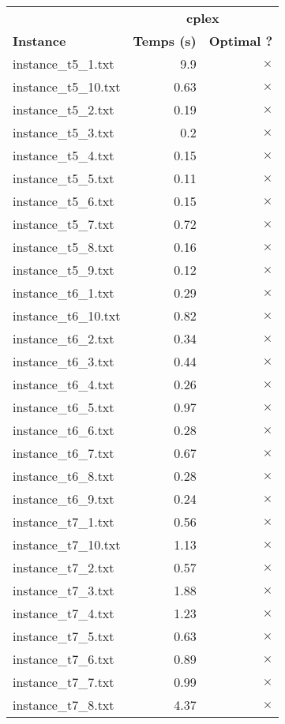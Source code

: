 \documentclass{article}
\begin{document}
\begin{center}
\renewcommand{\arraystretch}{1.4} 
 \begin{tabular}{lrr}
	\hline
 & \multicolumn{2}{c}{\textbf{cplex}}\\
\textbf{Instance}  & \textbf{Temps (s)} & \textbf{Optimal ?} \\\hline

instance\_t5\_1.txt & 9.9 & 
$\times$
\\
instance\_t5\_10.txt & 0.63 & 
$\times$
\\
instance\_t5\_2.txt & 0.19 & 
$\times$
\\
instance\_t5\_3.txt & 0.2 & 
$\times$
\\
instance\_t5\_4.txt & 0.15 & 
$\times$
\\
instance\_t5\_5.txt & 0.11 & 
$\times$
\\
instance\_t5\_6.txt & 0.15 & 
$\times$
\\
instance\_t5\_7.txt & 0.72 & 
$\times$
\\
instance\_t5\_8.txt & 0.16 & 
$\times$
\\
instance\_t5\_9.txt & 0.12 & 
$\times$
\\
instance\_t6\_1.txt & 0.29 & 
$\times$
\\
instance\_t6\_10.txt & 0.82 & 
$\times$
\\
instance\_t6\_2.txt & 0.34 & 
$\times$
\\
instance\_t6\_3.txt & 0.44 & 
$\times$
\\
instance\_t6\_4.txt & 0.26 & 
$\times$
\\
instance\_t6\_5.txt & 0.97 & 
$\times$
\\
instance\_t6\_6.txt & 0.28 & 
$\times$
\\
instance\_t6\_7.txt & 0.67 & 
$\times$
\\
instance\_t6\_8.txt & 0.28 & 
$\times$
\\
instance\_t6\_9.txt & 0.24 & 
$\times$
\\
instance\_t7\_1.txt & 0.56 & 
$\times$
\\
instance\_t7\_10.txt & 1.13 & 
$\times$
\\
instance\_t7\_2.txt & 0.57 & 
$\times$
\\
instance\_t7\_3.txt & 1.88 & 
$\times$
\\
instance\_t7\_4.txt & 1.23 & 
$\times$
\\
instance\_t7\_5.txt & 0.63 & 
$\times$
\\
instance\_t7\_6.txt & 0.89 & 
$\times$
\\
instance\_t7\_7.txt & 0.99 & 
$\times$
\\
instance\_t7\_8.txt & 4.37 & 
$\times$
\\
\hline\end{tabular}
\end{center}
\end{document}
